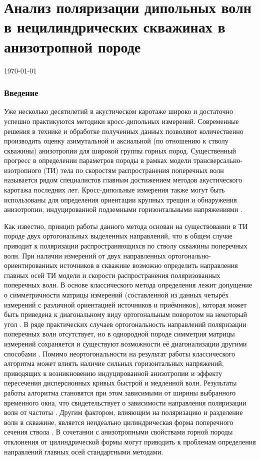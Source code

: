 \documentclass[a4paper,11pt]{article}
\begin{document}
\part*{Анализ поляризации дипольных волн в нецилиндрических скважинах в анизотропной породе}
\today

\section{Введение}
Уже несколько десятилетий в акустическом каротаже широко и достаточно успешно практикуются методики кросс-дипольных измерений. Современные решения в технике и обработке полученных данных позволяют количественно производить оценку азимутальной и аксиальной (по отношению к стволу скважины) анизотропии для широкой группы горных пород. Существенный прогресс в определении параметров породы в рамках модели трансверсально-изотропного (ТИ) тела по скоростям распространения поперечных волн называется рядом специалистов главным достижением методов акустического каротажа последних лет. Кросс-дипольные измерения также могут быть использованы для определения ориентации крупных трещин и обнаружения анизотропии, индуцированной подземными горизонтальными напряжениями \cite{Patterson2001}.

Как известно, принцип работы данного метода основан на существовании в ТИ породе двух ортогональных выделенных направлений, что в общем случае приводит к поляризации распространяющихся по стволу скважины поперечных волн. При наличии измерений от двух направленных ортогонально-ориентированных источников в скважине возможно определить направления главных осей ТИ модели и скорости распространения поляризованных поперечных волн. В основе классического метода определения лежит допущение о симметричности матрицы измерений (составленной из данных четырёх измерений с различной ориентацией источников и приёмников), которая может быть приведена к диагональному виду ортогональным поворотом на некоторый угол \cite{Alford1986}. В ряде практических случаев ортогональность направлений поляризации поперечных волн отсутствует, но в однородной породе симметрия матрицы измерений сохраняется и существуют возможности её диагонализации другими способами \cite{Dellinger1998}. Помимо неортогональности на результат работы классического алгоритма может влиять наличие сильных горизонтальных напряжений, приводящих к возникновению индуцированной анизотропии и эффекту пересечения дисперсионных кривых быстрой и медленной волн. Результаты работы алгоритма становятся при этом зависимыми от ширины выбранного временного окна, что свидетельствует о зависимости направления поляризации волн от частоты \cite{Nolte1997}. Другим фактором, влияющим на поляризацию и разделение волн в скважине, является неидеально цилиндрическая форма поперечного сечения ствола \cite{Seroices2010}. В сочетании с анизотропными свойствами горной породы отклонения от цилиндрической формы могут приводить к проблемам определения направлений главных осей стандартными методами.
\end{document}
